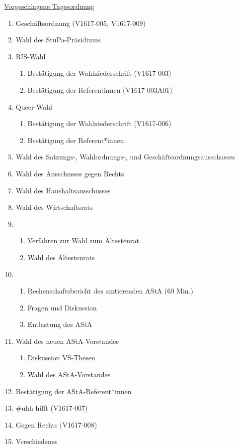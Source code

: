 \documentclass[ngerman,headheight=70pt]{scrartcl}
\begin{document}
    \underline{Vorgeschlagene Tagesordnung}
    \begin{enumerate}[label={\textbf{Top \theenumi}},leftmargin=*]
        \item Geschäftsordnung (V1617-005, V1617-009)
        \item Wahl des StuPa-Präsidiums
        \item RIS-Wahl
            \begin{enumerate}
                \item Bestätigung der Wahlniederschrift (V1617-003)
                \item Bestätigung der Referentinnen (V1617-003A01)
            \end{enumerate}
        \item Queer-Wahl
            \begin{enumerate}
                \item Bestätigung der Wahlniederschrift (V1617-006)
                \item Bestätigung der Referent*innen
            \end{enumerate}
        \item Wahl des Satzungs-, Wahlordnungs-, und Geschäftsordnungsausschusses
        \item Wahl des Ausschusses gegen Rechts
        \item Wahl des Haushaltsausschusses
        \item Wahl des Wirtschaftsrats
        \item
            \begin{enumerate}
                \item Verfahren zur Wahl zum Ältestenrat
                \item Wahl des Ältestenrats
            \end{enumerate}
        \item
            \begin{enumerate}
                \item Rechenschaftsbericht des amtierenden AStA (60 Min.)
                \item Fragen und Diskussion
                \item Entlastung des AStA
            \end{enumerate}
        \item Wahl des neuen AStA-Vorstandes
            \begin{enumerate}
                \item Diskussion VS-Thesen
                \item Wahl des AStA-Vorstandes
            \end{enumerate}
        \item Bestätigung der AStA-Referent*innen
        \item #uhh hilft (V1617-007)
        \item Gegen Rechts (V1617-008)
        \item Verschiedenes
    \end{enumerate}
\end{document}
